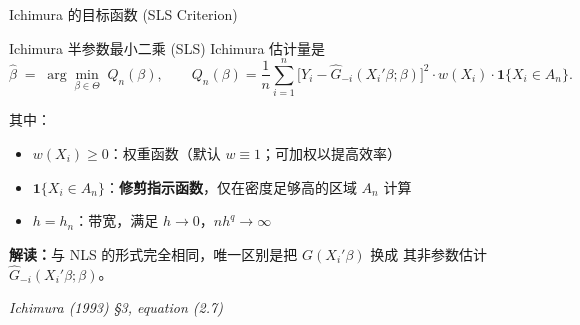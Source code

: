 \documentclass[aspectratio=169, 10pt]{beamer}
\begin{document}
\begin{frame}{Ichimura 的目标函数 (SLS Criterion)}

  \begin{definitionbox}{{Ichimura 半参数最小二乘 (SLS)}}
    Ichimura 估计量是
    $$\hat\beta \;=\; \arg\min_{\beta \in \Theta} \;
    Q_n(\beta), \qquad
    Q_n(\beta) = \frac{1}{n}\sum_{i=1}^n
    \bigl[Y_i - \hat G_{-i}(X_i'\beta; \beta)\bigr]^2 \cdot w(X_i)\cdot \mathbf{1}\{X_i \in A_n\}.$$

    其中：
    \begin{itemize}\setlength{\itemsep}{1pt}
      \item $w(X_i) \geq 0$：权重函数（默认 $w \equiv 1$；可加权以提高效率）
      \item $\mathbf{1}\{X_i \in A_n\}$：\textbf{修剪指示函数}，仅在密度足够高的区域 $A_n$ 计算
      \item $h = h_n$：带宽，满足 $h \to 0$，$nh^q \to \infty$
    \end{itemize}
  \end{definitionbox}

  \textbf{解读：}与 NLS 的形式完全相同，唯一区别是把 $G(X_i'\beta)$ 换成
  其非参数估计 $\hat G_{-i}(X_i'\beta; \beta)$。

  \hfill{\scriptsize\textit{Ichimura (1993) §3, equation (2.7)}}

\end{frame}
\end{document}
